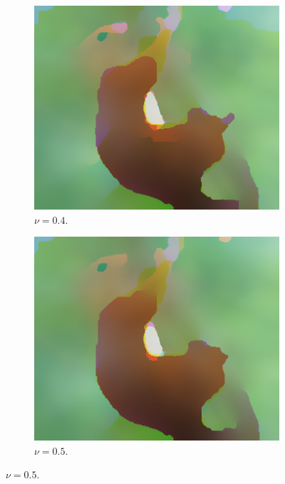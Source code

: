 \documentclass[abstracton]{scrreprt}
\begin{document}
\begin{figure}[!ht]
                \begin{subfigure}[b]{0.24\textwidth}
                    \includegraphics[width=\textwidth]{img/segmentation/rt/04squirrel.png}
                    \caption{$\nu = 0.4$.}
                \end{subfigure}
                \begin{subfigure}[b]{0.24\textwidth}
                    \includegraphics[width=\textwidth]{img/segmentation/rt/05squirrel.png}
                    \caption{$\nu = 0.5$.}
                \end{subfigure}

\end{figure}
\end{document}
